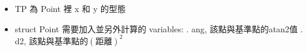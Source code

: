 \begin{itemize}
    \item TP 為 Point 裡 x 和 y 的型態
    \item struct Point 需要加入並另外計算的 variables:
        . ang, 該點與基準點的atan2值
        . d2, 該點與基準點的$(距離)^2$
\end{itemize}